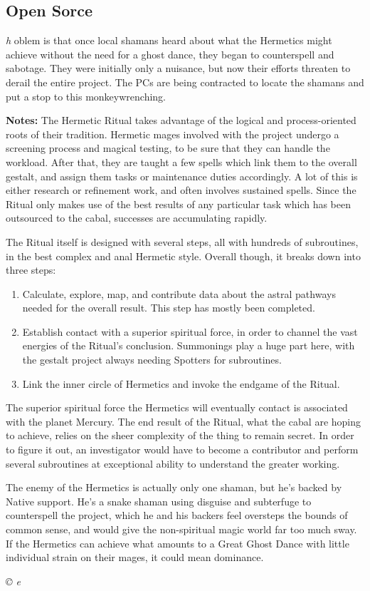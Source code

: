 \documentclass[letterpaper,onecolumn,10pt]{article}
\renewcommand{\textsc}[1]{{\fontspec{Friz Quadrata SC TT}\selectfont #1}}
\newcommand{\getyear}[1]{\StrLeft{#1}{4}}
\newenvironment{scenario}[6]
	{
		\section[#1 {\small\textsc{[#2]}}]{#1} \nopagebreak

		\noindent{\textsc{#2}}\nopagebreak

		\noindent\textit{#3}\nopagebreak
		\def\TMPSCENARIO{{\small\textit{©\getyear{#5}{} #4}}}
	}
	{\TMPSCENARIO}
\newcommand{\notes}{\textbf{Notes: }}
\begin{document}
\begin{multicols}{2}
\begin{scenario}{Open Sorce}
The problem is that once local shamans heard about what the Hermetics might achieve without the need for a ghost dance, they began to counterspell and sabotage. They were initially only a nuisance, but now their efforts threaten to derail the entire project. The PCs are being contracted to locate the shamans and put a stop to this monkeywrenching.

\notes The Hermetic Ritual takes advantage of the logical and process-oriented roots of their tradition. Hermetic mages involved with the project undergo a screening process and magical testing, to be sure that they can handle the workload. After that, they are taught a few spells which link them to the overall gestalt, and assign them tasks or maintenance duties accordingly. A lot of this is either research or refinement work, and often involves sustained spells. Since the Ritual only makes use of the best results of any particular task which has been outsourced to the cabal, successes are accumulating rapidly.

The Ritual itself is designed with several steps, all with hundreds of subroutines, in the best complex and anal Hermetic style. Overall though, it breaks down into three steps:

\begin{enumerate}
\item Calculate, explore, map, and contribute data about the astral pathways needed for the overall result. This step has mostly been completed.
\item Establish contact with a superior spiritual force, in order to channel the vast energies of the Ritual's conclusion. Summonings play a huge part here, with the gestalt project always needing Spotters for subroutines.
\item Link the inner circle of Hermetics and invoke the endgame of the Ritual.
\end{enumerate}

The superior spiritual force the Hermetics will eventually contact is associated with the planet Mercury. The end result of the Ritual, what the cabal are hoping to achieve, relies on the sheer complexity of the thing to remain secret. In order to figure it out, an investigator would have to become a contributor and perform several subroutines at exceptional ability to understand the greater working.

The enemy of the Hermetics is actually only one shaman, but he's backed by Native support. He's a snake shaman using disguise and subterfuge to counterspell the project, which he and his backers feel oversteps the bounds of common sense, and would give the non-spiritual magic world far too much sway. If the Hermetics can achieve what amounts to a Great Ghost Dance with little individual strain on their mages, it could mean dominance.


\end{scenario}
\end{multicols}
\end{document}
